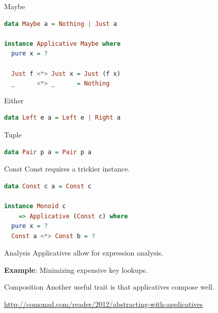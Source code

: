 \documentclass[utf8x,notes,17pt]{beamer}
\begin{document}
\begin{frame}[fragile,label=sec-15-11]{Maybe}
\begin{lstlisting}[language=Haskell]
data Maybe a = Nothing | Just a

instance Applicative Maybe where
  pure x = ?

  Just f <*> Just x = Just (f x)
  _      <*> _      = Nothing
\end{lstlisting}
\end{frame}
\begin{frame}[fragile,label=sec-15-12]{Either}
\begin{lstlisting}[language=Haskell]
data Left e a = Left e | Right a
\end{lstlisting}
\end{frame}
\begin{frame}[fragile,label=sec-15-13]{Tuple}
\begin{lstlisting}[language=Haskell]
data Pair p a = Pair p a
\end{lstlisting}
\end{frame}
\begin{frame}[fragile,label=sec-15-14]{Const}
\alert{Const} requires a trickier instance.
\begin{example}[\vspace*{-3.5ex}]
\begin{lstlisting}[language=Haskell]
data Const c a = Const c

instance Monoid c
    => Applicative (Const c) where
  pure x = ?
  Const a <*> Const b = ?
\end{lstlisting}
\end{example}
\end{frame}
\begin{frame}[fragile,label=sec-15-15]{Analysis}
Applicatives allow for expression analysis.

\vspace{2ex}\textbf{Example}: Minimizing expensive key lookups.
\end{frame}
\begin{frame}[fragile,label=sec-15-16]{Composition}
Another useful trait is that applicatives compose well.

\fontsize{14}{16}\selectfont
\vspace{2ex}\url{http://comonad.com/reader/2012/abstracting-with-applicatives}
\end{frame}
\end{document}
